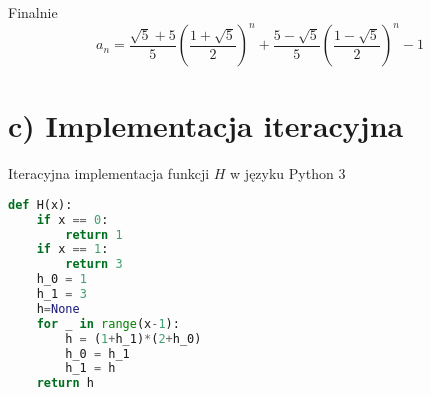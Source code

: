 \documentclass[12pt]{article}
\begin{document}
Finalnie
$$
a_n= \frac{\sqrt{5}+5}{5}\left(\frac{1+\sqrt{5}}{2}\right)^n+\frac{5-\sqrt{5}}{5} \left(\frac{1-\sqrt{5}}{2}\right)^n - 1
$$

\section*{c) Implementacja iteracyjna}
Iteracyjna implementacja funkcji $H$ w języku Python 3
\begin{lstlisting}[language=python]
def H(x):
    if x == 0:
        return 1
    if x == 1:
        return 3
    h_0 = 1
    h_1 = 3
    h=None
    for _ in range(x-1):
        h = (1+h_1)*(2+h_0)
        h_0 = h_1
        h_1 = h
    return h
\end{lstlisting}
\end{document}
